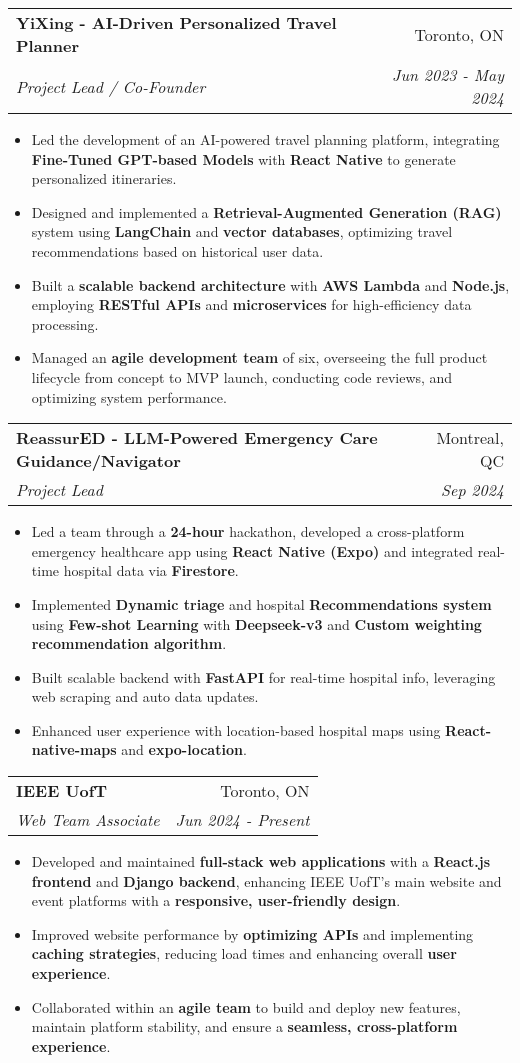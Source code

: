 \documentclass[letterpaper,10pt]{article}
\makeatletter
\newcommand{\resumeItem}[1]{
  \item\small{
    {#1 \vspace{-5pt}}
  }
}
\newcommand{\resumeSubheading}[4]{
  \vspace{-2pt}\item
    \begin{tabular*}{0.97\textwidth}[t]{l@{\extracolsep{\fill}}r}
      \textbf{#1} & #2 \\
      \textit{\small#3} & \textit{\small #4} \\
    \end{tabular*}\vspace{-7pt}
}
\newcommand{\resumeItemListStart}{\begin{itemize}}
\newcommand{\resumeItemListEnd}{\end{itemize}\vspace{-5pt}}
\makeatother
\begin{document}
  \resumeSubheading
  {YiXing - AI-Driven Personalized Travel Planner}{Toronto, ON}
  {Project Lead / Co-Founder}{Jun 2023 - May 2024}
  \resumeItemListStart
      \resumeItem{Led the development of an AI-powered travel planning platform, integrating \textbf{Fine-Tuned GPT-based Models} with \textbf{React Native} to generate personalized itineraries.}
      \resumeItem{Designed and implemented a \textbf{Retrieval-Augmented Generation (RAG)} system using \textbf{LangChain} and \textbf{vector databases}, optimizing travel recommendations based on historical user data.}
      \resumeItem{Built a \textbf{scalable backend architecture} with \textbf{AWS Lambda} and \textbf{Node.js}, employing \textbf{RESTful APIs} and \textbf{microservices} for high-efficiency data processing.}
      \resumeItem{Managed an \textbf{agile development team} of six, overseeing the full product lifecycle from concept to MVP launch, conducting code reviews, and optimizing system performance.}
  \resumeItemListEnd


  \resumeSubheading
  {ReassurED - LLM-Powered Emergency Care Guidance/Navigator}{Montreal, QC}
  {Project Lead}{Sep 2024}
  \resumeItemListStart
    \resumeItem{Led a team through a \textbf{24-hour} hackathon, developed a cross-platform emergency healthcare app using \textbf{React Native (Expo)} and integrated real-time hospital data via \textbf{Firestore}.}
    \resumeItem{Implemented \textbf{Dynamic triage} and hospital \textbf{Recommendations system} using \textbf{Few-shot Learning} with \textbf{Deepseek-v3} and \textbf{Custom weighting recommendation algorithm}.}
    \resumeItem{Built scalable backend with \textbf{FastAPI} for real-time hospital info, leveraging web scraping and auto data updates.}
    \resumeItem{Enhanced user experience with location-based hospital maps using \textbf{React-native-maps} and \textbf{expo-location}.}
  \resumeItemListEnd

  
  \resumeSubheading
  {IEEE UofT}{Toronto, ON}
  {Web Team Associate}{Jun 2024 - Present}
  \resumeItemListStart
    \resumeItem{Developed and maintained \textbf{full-stack web applications} with a \textbf{React.js frontend} and \textbf{Django backend}, enhancing IEEE UofT's main website and event platforms with a \textbf{responsive, user-friendly design}.}
    \resumeItem{Improved website performance by \textbf{optimizing APIs} and implementing \textbf{caching strategies}, reducing load times and enhancing overall \textbf{user experience}.}
    \resumeItem{Collaborated within an \textbf{agile team} to build and deploy new features, maintain platform stability, and ensure a \textbf{seamless, cross-platform experience}.}
  \resumeItemListEnd
\end{document}
